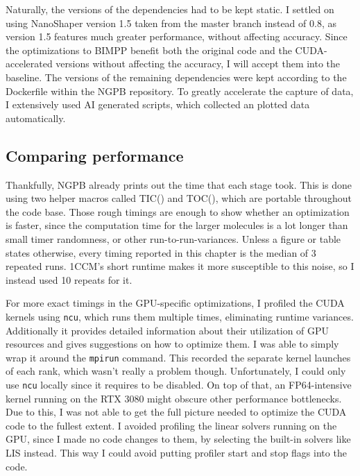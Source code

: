 Naturally, the versions of the dependencies had to be kept static. I settled on using NanoShaper version 1.5 taken from the master branch instead of 0.8, as version 1.5 features much greater performance, without affecting accuracy.
Since the optimizations to BIMPP benefit both the original code and the CUDA-accelerated versions without affecting the accuracy, I will accept them into the baseline.
The versions of the remaining dependencies were kept according to the Dockerfile within the NGPB repository.
To greatly accelerate the capture of data, I extensively used AI generated scripts, which collected an plotted data automatically.

\subsection{Comparing performance}
\label{sec:evaluation-experimental-setup-comparing-speed}

Thankfully, NGPB already prints out the time that each stage took. 
This is done using two helper macros called TIC() and TOC(), which are portable throughout the code base. 
Those rough timings are enough to show whether an optimization is faster, since the computation time for the larger molecules is a lot longer than small timer randomness, or other run-to-run-variances.
Unless a figure or table states otherwise, every timing reported in this chapter is the median of 3 repeated runs. 1CCM's short runtime makes it more susceptible to this noise, so I instead used 10 repeats for it.

For more exact timings in the GPU-specific optimizations, I profiled the CUDA kernels using \texttt{ncu}, which runs them multiple times, eliminating runtime variances.
Additionally it provides detailed information about their utilization of GPU resources and gives suggestions on how to optimize them. 
I was able to simply wrap it around the \texttt{mpirun} command. 
This recorded the separate kernel launches of each rank, which wasn't really a problem though. 
Unfortunately, I could only use \texttt{ncu} locally since it requires  to be disabled.
On top of that, an FP64-intensive kernel running on the RTX 3080 might obscure other performance bottlenecks.
Due to this, I was not able to get the full picture needed to optimize the CUDA code to the fullest extent.
I avoided profiling the linear solvers running on the GPU, since I made no code changes to them, by selecting the built-in solvers like LIS instead. 
This way I could avoid putting profiler start and stop flags into the code.

